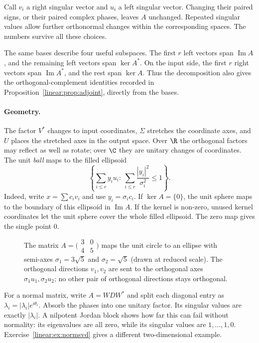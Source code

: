 Call $v_i$ a right singular vector and $u_i$ a left singular vector. Changing their paired signs, or their paired complex phases, leaves $A$ unchanged. Repeated singular values allow further orthonormal changes within the corresponding spaces. The numbers survive all these choices.

The same bases describe four useful subspaces. The first $r$ left vectors span $\operatorname{Im}A$, and the remaining left vectors span $\ker A^*$. On the input side, the first $r$ right vectors span $\operatorname{Im}A^*$, and the rest span $\ker A$. Thus the decomposition also gives the orthogonal-complement identities recorded in Proposition~\ref{linear:prop:adjoint}, directly from the bases.

\paragraph{Geometry.} The factor $V^*$ changes to input coordinates, $\Sigma$ stretches the coordinate axes, and $U$ places the stretched axes in the output space. Over $\R$ the orthogonal factors may reflect as well as rotate; over $\C$ they are unitary changes of coordinates. The unit \emph{ball} maps to the filled ellipsoid
\[
\left\{\sum_{i\le r}y_iu_i:\ \sum_{i\le r}\frac{|y_i|^2}{\sigma_i^2}\le1\right\}.
\]
Indeed, write $x=\sum c_iv_i$ and use $y_i=\sigma_ic_i$. If $\ker A=\{0\}$, the unit sphere maps to the boundary of this ellipsoid in $\operatorname{Im}A$. If the kernel is non-zero, unused kernel coordinates let the unit sphere cover the whole filled ellipsoid. The zero map gives the single point $0$.

\begin{figure}[ht]
\centering
{}
\caption{The matrix $A=\bigl(\begin{smallmatrix}3&0\\4&5\end{smallmatrix}\bigr)$ maps the unit circle to an ellipse with
semi-axes $\sigma_1=3\sqrt5$ and $\sigma_2=\sqrt5$ (drawn at reduced scale). The orthogonal directions $v_1,v_2$ are sent to
the orthogonal axes $\sigma_1u_1,\sigma_2u_2$; no other pair of orthogonal directions stays orthogonal.}
\label{linear:fig:ellipse}
\end{figure}

For a normal matrix, write $A=WDW^*$ and split each diagonal entry as $\lambda_i=|\lambda_i|e^{i\theta_i}$. Absorb the phases into one unitary factor. Its singular values are exactly $|\lambda_i|$. A nilpotent Jordan block shows how far this can fail without normality: its eigenvalues are all zero, while its singular values are $1,\ldots,1,0$. Exercise~\ref{linear:ex:normsvd} gives a different two-dimensional example.

